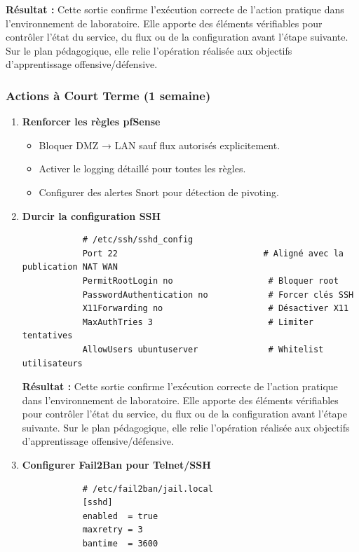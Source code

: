 \documentclass[12pt,a4paper,openany]{report}
\begin{document}
\begin{tcolorbox}[colback=accent!5!white, breakable, nobeforeafter, colframe=accent, title=\textbf{PRIORITÉ CRITIQUE}]
\begin{enumerate}
			\textbf{Résultat :} Cette sortie confirme l'exécution correcte de l'action pratique dans l'environnement de laboratoire. Elle apporte des éléments vérifiables pour contrôler l'état du service, du flux ou de la configuration avant l'étape suivante. Sur le plan pédagogique, elle relie l'opération réalisée aux objectifs d'apprentissage offensive/défensive.
			
		\end{enumerate}
	\end{tcolorbox}
	
	\subsubsection{Actions à Court Terme (1 semaine)}
	
	\begin{enumerate}
		\item \textbf{Renforcer les règles pfSense}
		\begin{itemize}
			\item Bloquer DMZ → LAN sauf flux autorisés explicitement.
			\item Activer le logging détaillé pour toutes les règles.
			\item Configurer des alertes Snort pour détection de pivoting.
		\end{itemize}
		
		\item \textbf{Durcir la configuration SSH}
		\begin{lstlisting}
			# /etc/ssh/sshd_config
			Port 22                             # Aligné avec la publication NAT WAN
			PermitRootLogin no                   # Bloquer root
			PasswordAuthentication no            # Forcer clés SSH
			X11Forwarding no                     # Désactiver X11
			MaxAuthTries 3                       # Limiter tentatives
			AllowUsers ubuntuserver              # Whitelist utilisateurs
		\end{lstlisting}
		
		\textbf{Résultat :} Cette sortie confirme l'exécution correcte de l'action pratique dans l'environnement de laboratoire. Elle apporte des éléments vérifiables pour contrôler l'état du service, du flux ou de la configuration avant l'étape suivante. Sur le plan pédagogique, elle relie l'opération réalisée aux objectifs d'apprentissage offensive/défensive.
		
		
		\item \textbf{Configurer Fail2Ban pour Telnet/SSH}
		\begin{lstlisting}
			# /etc/fail2ban/jail.local
			[sshd]
			enabled  = true
			maxretry = 3
			bantime  = 3600
			

\end{lstlisting}
\end{enumerate}
\end{document}

